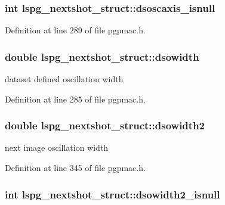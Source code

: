 \hypertarget{structlspg__nextshot__struct_a51a26391afcacfb4c946fb9e8e9ab6b0}{
\subsubsection[{dsoscaxis\-\_\-isnull}]{\setlength{\rightskip}{0pt plus 5cm}int lspg\-\_\-nextshot\-\_\-struct\-::dsoscaxis\-\_\-isnull}}\label{structlspg__nextshot__struct_a51a26391afcacfb4c946fb9e8e9ab6b0}


Definition at line 289 of file pgpmac.\-h.

\hypertarget{structlspg__nextshot__struct_ad5a8f568a04aa6a13767933062b28f19}{
\subsubsection[{dsowidth}]{\setlength{\rightskip}{0pt plus 5cm}double lspg\-\_\-nextshot\-\_\-struct\-::dsowidth}}\label{structlspg__nextshot__struct_ad5a8f568a04aa6a13767933062b28f19}


dataset defined oscillation width 



Definition at line 285 of file pgpmac.\-h.

\hypertarget{structlspg__nextshot__struct_a5378e13735a5392a9fcd853ce8c9e929}{
\subsubsection[{dsowidth2}]{\setlength{\rightskip}{0pt plus 5cm}double lspg\-\_\-nextshot\-\_\-struct\-::dsowidth2}}\label{structlspg__nextshot__struct_a5378e13735a5392a9fcd853ce8c9e929}


next image oscillation width 



Definition at line 345 of file pgpmac.\-h.

\hypertarget{structlspg__nextshot__struct_a5ffd27b8063506fd54162658e5c2ce8a}{
\subsubsection[{dsowidth2\-\_\-isnull}]{\setlength{\rightskip}{0pt plus 5cm}int lspg\-\_\-nextshot\-\_\-struct\-::dsowidth2\-\_\-isnull}}\label{structlspg__nextshot__struct_a5ffd27b8063506fd54162658e5c2ce8a}


